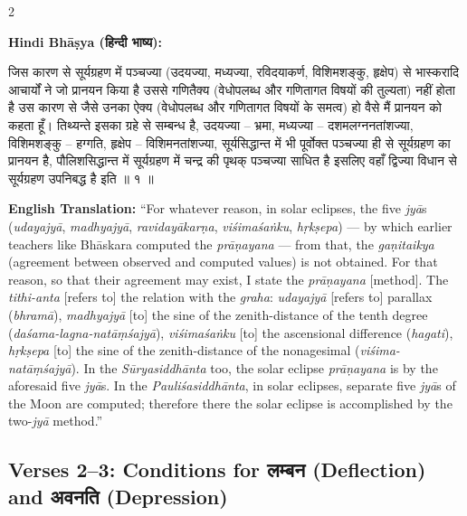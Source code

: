 \documentclass[11pt,a4paper]{article}
\newcommand{\dev}[1]{{\devanagarifont #1}}
\newenvironment{sanskritverse}{%
  \begin{center}\begin{minipage}{0.95\textwidth}
  \setlength{\leftskip}{1em}
  \setlength{\rightskip}{1em}
  \dev
}{\end{minipage}\end{center}}
\begin{document}
\begin{paracol}{2}

\noindent\textbf{Hindi Bhāṣya (\dev{हिन्दी भाष्य}):}
\begin{sanskritverse}
जिस कारण से सूर्यग्रहण में पञ्चज्या (उदयज्या, मध्यज्या, रविदयाकर्ण, विशिमशङ्कु,
हृक्षेप) से भास्करादि आचार्यों ने जो प्रानयन किया है उससे गणितैक्य (वेधोपलब्ध और
गणितागत विषयों की तुल्यता) नहीं होता है उस कारण से जैसे उनका ऐक्य (वेधोपलब्ध और
गणितागत विषयों के समत्व) हो वैसे मैं प्रानयन को कहता हूँ। तिथ्यन्ते इसका ग्रहे से
सम्बन्ध है, उदयज्या -- भ्रमा, मध्यज्या -- दशमलग्ननतांशज्या, विशिमशङ्कु -- हग्गति,
हृक्षेप -- विशिमनतांशज्या, सूर्यसिद्धान्त में भी पूर्वोक्त पञ्चज्या ही से सूर्यग्रहण का
प्रानयन है, पौलिशसिद्धान्त में सूर्यग्रहण में चन्द्र की पृथक् पञ्चज्या साधित है इसलिए
वहाँ द्विज्या विधान से सूर्यग्रहण उपनिबद्ध है इति ॥ १ ॥
\end{sanskritverse}

\switchcolumn

\textbf{English Translation:} ``For whatever reason, in solar eclipses, the five \textit{jyā}s (\textit{udayajyā}, \textit{madhyajyā}, \textit{ravidayākarṇa}, \textit{viśimaśaṅku}, \textit{hṛkṣepa}) --- by which earlier teachers like Bhāskara computed the \textit{prāṇayana} --- from that, the \textit{gaṇitaikya} (agreement between observed and computed values) is not obtained. For that reason, so that their agreement may exist, I state the \textit{prāṇayana} [method]. The \textit{tithi-anta} [refers to] the relation with the \textit{graha}: \textit{udayajyā} [refers to] parallax (\textit{bhramā}), \textit{madhyajyā} [to] the sine of the zenith-distance of the tenth degree (\textit{daśama-lagna-natāṃśajyā}), \textit{viśimaśaṅku} [to] the ascensional difference (\textit{hagati}), \textit{hṛkṣepa} [to] the sine of the zenith-distance of the nonagesimal (\textit{viśima-natāṃśajyā}). In the \textit{Sūryasiddhānta} too, the solar eclipse \textit{prāṇayana} is by the aforesaid five \textit{jyā}s. In the \textit{Pauliśasiddhānta}, in solar eclipses, separate five \textit{jyā}s of the Moon are computed; therefore there the solar eclipse is accomplished by the two-\textit{jyā} method.''

\end{paracol}

\subsection{Verses 2--3: Conditions for \texorpdfstring{{\devanagarifont लम्बन}}{lambana} (Deflection) and \texorpdfstring{{\devanagarifont अवनति}}{avanati} (Depression)}
\end{document}
